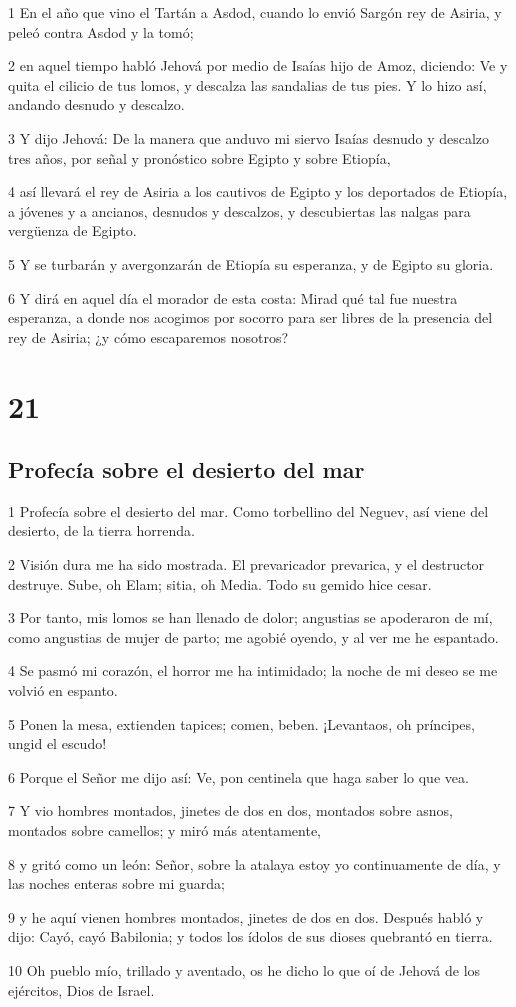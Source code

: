 \par 1 En el año que vino el Tartán a Asdod, cuando lo envió Sargón rey de Asiria, y peleó contra Asdod y la tomó;
\par 2 en aquel tiempo habló Jehová por medio de Isaías hijo de Amoz, diciendo: Ve y quita el cilicio de tus lomos, y descalza las sandalias de tus pies. Y lo hizo así, andando desnudo y descalzo.
\par 3 Y dijo Jehová: De la manera que anduvo mi siervo Isaías desnudo y descalzo tres años, por señal y pronóstico sobre Egipto y sobre Etiopía,
\par 4 así llevará el rey de Asiria a los cautivos de Egipto y los deportados de Etiopía, a jóvenes y a ancianos, desnudos y descalzos, y descubiertas las nalgas para vergüenza de Egipto.
\par 5 Y se turbarán y avergonzarán de Etiopía su esperanza, y de Egipto su gloria.
\par 6 Y dirá en aquel día el morador de esta costa: Mirad qué tal fue nuestra esperanza, a donde nos acogimos por socorro para ser libres de la presencia del rey de Asiria; ¿y cómo escaparemos nosotros?

\chapter{21}

\section*{Profecía sobre el desierto del mar}

\par 1 Profecía sobre el desierto del mar. Como torbellino del Neguev, así viene del desierto, de la tierra horrenda.
\par 2 Visión dura me ha sido mostrada. El prevaricador prevarica, y el destructor destruye. Sube, oh Elam; sitia, oh Media. Todo su gemido hice cesar.
\par 3 Por tanto, mis lomos se han llenado de dolor; angustias se apoderaron de mí, como angustias de mujer de parto; me agobié oyendo, y al ver me he espantado.
\par 4 Se pasmó mi corazón, el horror me ha intimidado; la noche de mi deseo se me volvió en espanto.
\par 5 Ponen la mesa, extienden tapices; comen, beben. ¡Levantaos, oh príncipes, ungid el escudo!
\par 6 Porque el Señor me dijo así: Ve, pon centinela que haga saber lo que vea.
\par 7 Y vio hombres montados, jinetes de dos en dos, montados sobre asnos, montados sobre camellos; y miró más atentamente,
\par 8 y gritó como un león: Señor, sobre la atalaya estoy yo continuamente de día, y las noches enteras sobre mi guarda;
\par 9 y he aquí vienen hombres montados, jinetes de dos en dos. Después habló y dijo: Cayó, cayó Babilonia; y todos los ídolos de sus dioses quebrantó en tierra.
\par 10 Oh pueblo mío, trillado y aventado, os he dicho lo que oí de Jehová de los ejércitos, Dios de Israel.

